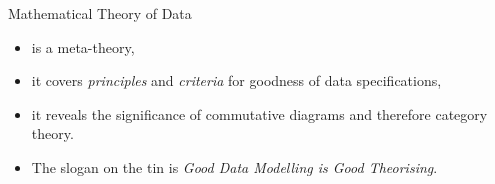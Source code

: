 \begin{frame}{Mathematical Theory of Data}
\begin{itemize}
\item is a meta-theory,
\item it covers \textit{principles} and \textit{criteria} for goodness of data specifications,
\item it reveals the significance of commutative diagrams and therefore category theory.
\item The slogan on the tin is \textit{Good Data Modelling is Good Theorising}. 
\end{itemize}
\end{frame}






